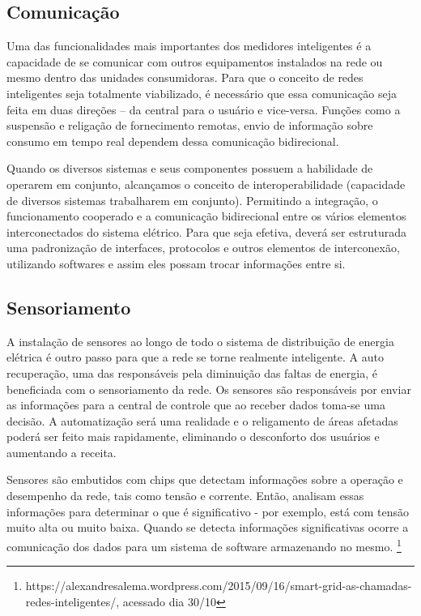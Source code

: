 \subsection{Comunicação}

	Uma das funcionalidades mais importantes dos medidores inteligentes é a capacidade de se comunicar com outros equipamentos instalados na rede ou mesmo dentro das unidades consumidoras. Para que o conceito de redes inteligentes seja totalmente viabilizado, é necessário que essa comunicação seja feita em duas direções – da central para o usuário e vice-versa. Funções como a suspensão e religação de fornecimento remotas, envio de informação sobre consumo em tempo real dependem dessa comunicação bidirecional.

	Quando os diversos sistemas e seus componentes possuem a habilidade de operarem em conjunto, alcançamos o conceito de interoperabilidade (capacidade de diversos sistemas trabalharem em conjunto). Permitindo a integração, o funcionamento cooperado e a comunicação bidirecional entre os vários elementos interconectados do sistema elétrico. Para que seja efetiva, deverá ser estruturada uma padronização de interfaces, protocolos e outros elementos de interconexão, utilizando softwares e assim eles possam trocar informações entre si. 

\subsection{Sensoriamento}

	A instalação de sensores ao longo de todo o sistema de distribuição de energia elétrica é outro passo para que a rede se torne realmente inteligente. A auto recuperação, uma das responsáveis pela diminuição das faltas de energia, é beneficiada com o sensoriamento da rede. Os sensores são responsáveis por enviar as informações para a central de controle que ao receber dados toma-se uma decisão. A automatização será uma realidade e o religamento de áreas afetadas poderá ser feito mais rapidamente, eliminando o desconforto dos usuários e aumentando a receita.

	Sensores são embutidos com chips que detectam informações sobre a operação e desempenho da rede, tais como tensão e corrente. Então, analisam essas informações para determinar o que é significativo - por exemplo, está com tensão muito alta ou muito baixa. Quando se detecta informações significativas ocorre a comunicação dos dados para um sistema de software armazenando no mesmo. \footnote{https://alexandresalema.wordpress.com/2015/09/16/smart-grid-as-chamadas-redes-inteligentes/, acessado dia 30/10}


